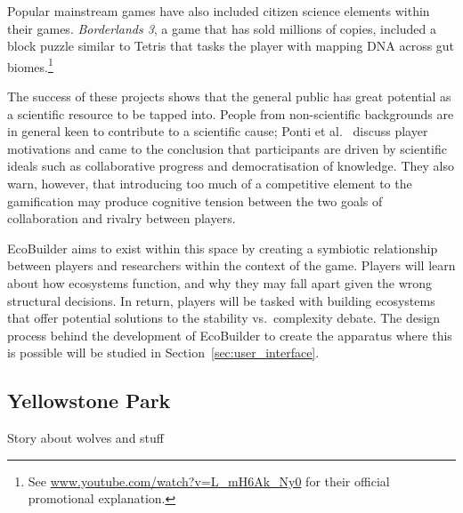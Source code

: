 Popular mainstream games have also included citizen science elements within their games. \emph{Borderlands 3}, a game that has sold millions of copies, included a block puzzle similar to Tetris that tasks the player with mapping DNA across gut biomes.\footnote{See \url{www.youtube.com/watch?v=L_mH6Ak_Ny0} for their official promotional explanation.}

The success of these projects shows that the general public has great potential as a scientific resource to be tapped into.
People from non-scientific backgrounds are in general keen to contribute to a scientific cause; Ponti et al.\ \cite{Ponti2018} discuss player motivations and came to the conclusion that participants are driven by scientific ideals such as collaborative progress and democratisation of knowledge. They also warn, however, that introducing too much of a competitive element to the gamification may produce cognitive tension between the two goals of collaboration and rivalry between players.

EcoBuilder aims to exist within this space by creating a symbiotic relationship between players and researchers within the context of the game. Players will learn about how ecosystems function, and why they may fall apart given the wrong structural decisions. In return, players will be tasked with building ecosystems that offer potential solutions to the stability vs.\ complexity debate.
The design process behind the development of EcoBuilder to create the apparatus where this is possible will be studied in Section~\ref{sec:user_interface}.

\subsection{Yellowstone Park}
\label{sec:yellowstone}
Story about wolves and stuff

